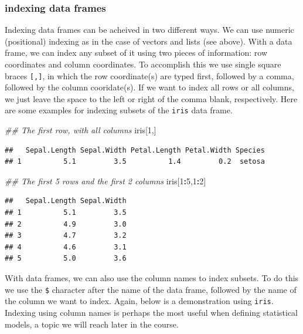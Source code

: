 \documentclass[]{book}
\newenvironment{Shaded}{\begin{snugshade}}{\end{snugshade}}
\newcommand{\CommentTok}[1]{\textcolor[rgb]{0.56,0.35,0.01}{\textit{#1}}}
\newcommand{\DecValTok}[1]{\textcolor[rgb]{0.00,0.00,0.81}{#1}}
\newcommand{\NormalTok}[1]{#1}
\newcommand{\OperatorTok}[1]{\textcolor[rgb]{0.81,0.36,0.00}{\textbf{#1}}}
\begin{document}
\hypertarget{indexing-data-frames}{%
\subsubsection{indexing data frames}\label{indexing-data-frames}}

Indexing data frames can be acheived in two different ways. We can use numeric (positional) indexing as in the case of vectors and lists (see above). With a data frame, we can index any subset of it using two pieces of information: row coordinates and column coordinates. To accomplish this we use single square braces \texttt{{[},{]}}, in which the row coordinate(s) are typed first, followed by a comma, followed by the column cooridate(s). If we want to index all rows or all columns, we just leave the space to the left or right of the comma blank, respectively. Here are some examples for indexing subsets of the \texttt{iris} data frame.

\begin{Shaded}
\begin{Highlighting}[]
\CommentTok{## The first row, with all columns}
\NormalTok{iris[}\DecValTok{1}\NormalTok{,]}
\end{Highlighting}
\end{Shaded}

\begin{verbatim}
##   Sepal.Length Sepal.Width Petal.Length Petal.Width Species
## 1          5.1         3.5          1.4         0.2  setosa
\end{verbatim}

\begin{Shaded}
\begin{Highlighting}[]
\CommentTok{## The first 5 rows and the first 2 columns}
\NormalTok{iris[}\DecValTok{1}\OperatorTok{:}\DecValTok{5}\NormalTok{,}\DecValTok{1}\OperatorTok{:}\DecValTok{2}\NormalTok{]}
\end{Highlighting}
\end{Shaded}

\begin{verbatim}
##   Sepal.Length Sepal.Width
## 1          5.1         3.5
## 2          4.9         3.0
## 3          4.7         3.2
## 4          4.6         3.1
## 5          5.0         3.6
\end{verbatim}

With data frames, we can also use the column names to index subsets. To do this we use the \texttt{\$} character after the name of the data frame, followed by the name of the column we want to index. Again, below is a demonstration using \texttt{iris}. Indexing using column names is perhaps the most useful when defining statistical models, a topic we will reach later in the course.
\end{document}
